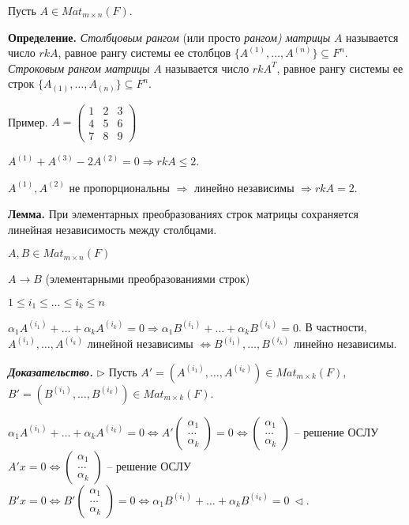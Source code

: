 \vspace{\baselineskip}
Пусть $A \in Mat_{m \times n} (F)$.

\vspace{\baselineskip}
\textbf{Определение.} \textit{Столбцовым рангом} (или просто \textit{рангом) матрицы} $A$ называется число $rkA$, равное рангу системы ее столбцов $\{A^{(1)}, \dots, A^{(n)}\} \subseteq F^n$. \textit{Строковым рангом матрицы} $A$ называется число $rkA^T$, равное рангу системы ее строк $\{A_{(1)}, \dots, A_{(n)}\} \subseteq F^n$.

\vspace{\baselineskip}
Пример. $A = \begin{pmatrix} 1 & 2 & 3 \\ 4 & 5 & 6 \\ 7 & 8 & 9 \end{pmatrix}$

$A^{(1)} + A^{(3)} - 2A^{(2)} = 0 \Rightarrow rkA \leq 2$.

$A^{(1)}, A^{(2)}$ не пропорциональны $\Rightarrow$ линейно независимы $\Rightarrow rkA = 2$.

\vspace{\baselineskip}
\textbf{Лемма.} При элементарных преобразованиях строк матрицы сохраняется линейная независимость между столбцами.

$A, B \in Mat_{m \times n} (F)$ 

$A \rightarrow B$ (элементарными преобразованиями строк)

$1 \leq i_1 \leq \dots \leq i_k \leq n$

$\alpha_1 A^{(i_1)} + \dots + \alpha_k A^{(i_k)} = 0 \Rightarrow \alpha_1 B^{(i_1)} + \dots + \alpha_k B^{(i_k)} = 0$. В частности, $A^{(i_1)}, \dots, A^{(i_k)}$ линейной независимы $\Leftrightarrow B^{(i_1)}, \dots, B^{(i_k)}$ линейно независимы.

\vspace{\baselineskip}
\textbf{\textit{Доказательство.}} $\rhd$ Пусть $A' = ( A^{(i_1)}, \dots, A^{(i_k)}) \in Mat_{m \times k} (F)$, $B' = (B^{(i_1)}, \dots, B^{(i_k)}) \in Mat_{m \times k} (F)$.

$\alpha_1 A^{(i_1)} + \dots + \alpha_k A^{(i_k)} = 0 \Leftrightarrow A' \begin{pmatrix} \alpha_1 \\ \dots \\ \alpha_k \end{pmatrix} = 0 \Leftrightarrow \begin{pmatrix} \alpha_1 \\ \dots \\ \alpha_k \end{pmatrix} $ -- решение ОСЛУ $A'x = 0 \Leftrightarrow \begin{pmatrix} \alpha_1 \\ \dots \\ \alpha_k \end{pmatrix} $ -- решение ОСЛУ $B'x = 0 \Leftrightarrow B' \begin{pmatrix} \alpha_1 \\ \dots \\ \alpha_k \end{pmatrix} = 0 \Leftrightarrow \alpha_1 B^{(i_1)} + \dots + \alpha_k B^{(i_k)} = 0 \ \lhd .$


